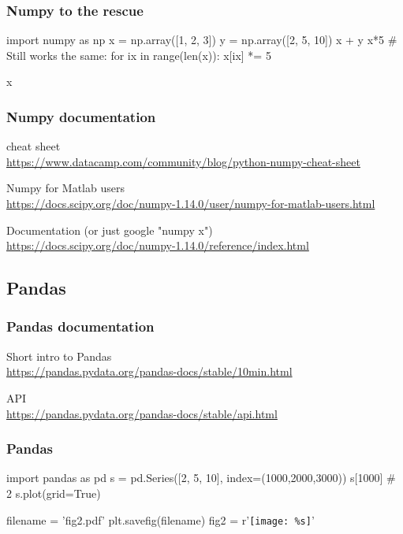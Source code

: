 \documentclass[12pt]{beamer}
\begin{document}
\begin{frame}[fragile]
\frametitle{Numpy to the rescue}
\begin{pyconsole}
import numpy as np
x = np.array([1, 2, 3])
y = np.array([2, 5, 10])
x + y
x*5
# Still works the same:
for ix in range(len(x)):
  x[ix] *= 5

x
\end{pyconsole}
\end{frame}

\begin{frame}[fragile]
\frametitle{Numpy documentation}
cheat sheet \\
\url{https://www.datacamp.com/community/blog/python-numpy-cheat-sheet} \\
\vspace{0.25cm}

Numpy for Matlab users \\
\url{https://docs.scipy.org/doc/numpy-1.14.0/user/numpy-for-matlab-users.html} \\
\vspace{0.25cm}

Documentation (or just google "numpy x")\\
\url{https://docs.scipy.org/doc/numpy-1.14.0/reference/index.html}
\end{frame}

\subsection{Pandas}
\begin{frame}[fragile]
\frametitle{Pandas documentation}
Short intro to Pandas\\
\url{https://pandas.pydata.org/pandas-docs/stable/10min.html} \\
\vspace{0.25cm}

API \\
\url{https://pandas.pydata.org/pandas-docs/stable/api.html} \\
\vspace{0.25cm}

\end{frame}


\begin{frame}[fragile]
\frametitle{Pandas}
\begin{pyblock}
import pandas as pd
s = pd.Series([2, 5, 10], index=(1000,2000,3000))
s[1000] # 2
s.plot(grid=True)
\end{pyblock}
\begin{pycode}
filename = 'fig2.pdf'
plt.savefig(filename)
fig2 = r'\texttt{[image: \%s]}' %
\end{pycode}
\end{frame}
\end{document}
